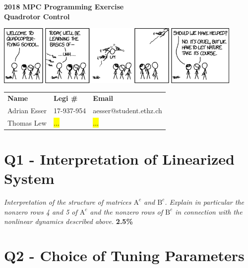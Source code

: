 \documentclass[12pt]{article}
\begin{document}
\thispagestyle{empty}

\begin{center}
    \LARGE \textbf{2018 MPC Programming Exercise} \\
    \Large \textbf{Quadrotor Control}
    \normalsize
\end{center}

\vfill

\begin{center}
    \includegraphics[width=0.9\textwidth]{Figures/quadcopter_comic.png}
\end{center}

\vfill

\begin{center}
    \begin{tabular}{l  l  l }
        \textbf{Name} & \textbf{Legi \#} & \textbf{Email} \\
        Adrian Esser & 17-937-954 & aesser@student.ethz.ch \\
        Thomas Lew & \hl{...} & \hl{...} \\
    \end{tabular}
\end{center}

\clearpage
\newpage

\tableofcontents

\clearpage
\newpage

\section{Q1 - Interpretation of Linearized System}

\begin{center}
    \textit{Interpretation of the structure of matrices $\mathrm{A}^c$ and $\mathrm{B}^c$.
    Explain in particular the nonzero rows 4 and 5 of $\mathrm{A}^c$ and the nonzero rows of
    $\mathrm{B}^c$ in connection with the nonlinear dynamics described above.} \textbf{2.5\%}
\end{center}
    

\section{Q2 - Choice of Tuning Parameters}
\end{document}
